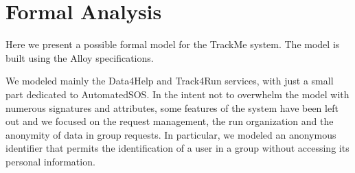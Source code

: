 \chapter{Formal Analysis}

Here we present a possible formal model for the TrackMe system. The model is built using the Alloy specifications.

We modeled mainly the Data4Help and Track4Run services, with just a small part dedicated to AutomatedSOS. In the intent not to overwhelm the model with numerous signatures and attributes, some features of the system have been left out and we focused on the request management, the run organization and the anonymity of data in group requests.
In particular, we modeled an anonymous identifier that permits the identification of a user in a group without accessing its personal information.

\vspace{12mm}

